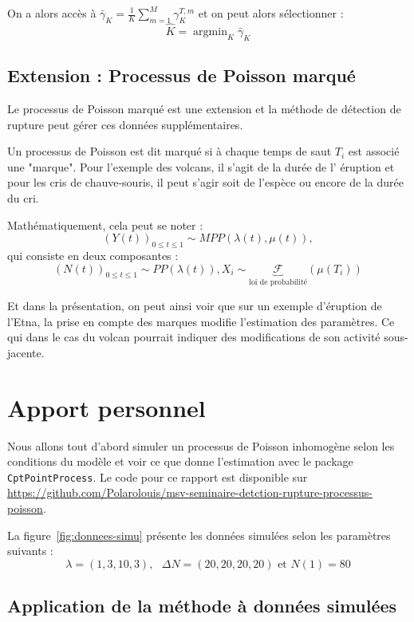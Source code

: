 \documentclass[a4paper,10pt]{article}\usepackage[]{graphicx}\usepackage[]{xcolor}
\DeclareMathOperator*{\argmin}{argmin}
\begin{document}
On a alors accès à $\bar{\gamma}_K = \frac{1}{K} \sum_{m=1}^M \gamma^{T,m}_K$ et
on peut alors sélectionner :
$$\hat{K} = \argmin_K \bar{\gamma}_K$$

\subsection{Extension : Processus de Poisson marqué}

Le processus de Poisson marqué est une extension et la méthode de détection de
rupture peut gérer ces données supplémentaires.

Un processus de Poisson est dit marqué si à chaque temps de saut $T_i$ est 
associé une "marque". Pour l'exemple des volcans, il s'agit de la durée de l'
éruption et pour les cris de chauve-souris, il peut s'agir soit de l'espèce ou 
encore de la durée du cri.

Mathématiquement, cela peut se noter : 
$$(Y(t))_{0\leq t \leq 1} \sim MPP(\lambda(t), \mu(t)),$$ 
qui consiste en deux composantes :
$$(N(t))_{0\leq t \leq 1} \sim PP(\lambda(t)), X_i \sim \underbrace{\mathcal{F}}_{\text{loi de probabilité}}(\mu(T_i))$$

Et dans la présentation, on peut ainsi voir que sur un exemple d'éruption de 
l'Etna, la prise en compte des marques modifie l'estimation des paramètres. Ce 
qui dans le cas du volcan pourrait indiquer des modifications de son activité
sous-jacente.

\section{Apport personnel}



Nous allons tout d'abord simuler un processus de Poisson inhomogène selon les 
conditions du modèle et voir ce que donne l'estimation avec le package 
\texttt{CptPointProcess}. Le 
code pour ce rapport est disponible sur 
\url{https://github.com/Polarolouis/msv-seminaire-detction-rupture-processus-poisson}.



La figure~\ref{fig:donnees-simu} présente les données simulées selon les 
paramètres suivants :
$$ \lambda = (1, 3, 10, 3), \text{ } \Delta N = (20, 20, 20, 20)
\text{ et } N(1) = 80 $$

\subsection*{Application de la méthode à données simulées}
\end{document}
